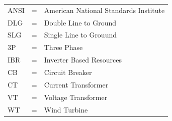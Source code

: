 
\begin{tabular}{llp{3in}}
	ANSI & \hspace{1.5cm} = & American National Standards Institute \\
	DLG  & \hspace{1.5cm} = & Double Line to Ground                 \\
	SLG  & \hspace{1.5cm} = & Single Line to Grouund                \\
	3P   & \hspace{1.5cm} = & Three Phase                           \\
	IBR  & \hspace{1.5cm} = & Inverter Based Resources              \\
	CB   & \hspace{1.5cm} = & Circuit Breaker		                \\
	CT   & \hspace{1.5cm} = & Current Transformer                   \\
	VT   & \hspace{1.5cm} = & Voltage Transformer                   \\
	WT   & \hspace{1.5cm} = & Wind Turbine                          \\
\end{tabular}
